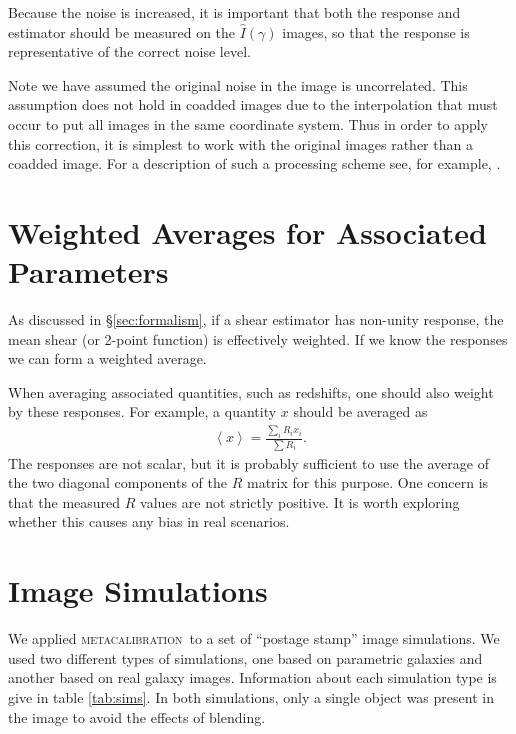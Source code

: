 \documentclass[iop]{emulateapj}
\newcommand{\mcal}{\textsc{metacalibration}}
\begin{document}
Because the noise is increased, it is important that both the response and
estimator should be measured on the $\hat{I}(\gamma)$ images, so that the
response is representative of the correct noise level.

Note we have assumed the original noise in the image is uncorrelated.  This
assumption does not hold in coadded images due to the interpolation that must
occur to put all images in the same coordinate system.  Thus in order to apply
this correction, it is simplest to work with the original images rather than
a coadded image.  For a description of such a processing scheme see, for example,
\cite{DESSVShear}.


\section{Weighted Averages for Associated Parameters} \label{sec:weighting}

As discussed in \S \ref{sec:formalism}, if a shear estimator has
non-unity response, the mean shear (or 2-point function) is effectively
weighted.  If we know the responses we can form a weighted average.

When averaging associated quantities, such as redshifts, one should also weight
by these responses.  For example, a quantity $x$ should be averaged as
\begin{align}
    \left< x \right> = \frac{\sum_i R_i x_i}{\sum R_i}.
\end{align}
The responses are not scalar, but it is probably sufficient
to use the average of the two diagonal components of the $R$ matrix
for this purpose. One concern is that the measured $R$ values are not
strictly positive.  It is worth exploring whether this causes
any bias in real scenarios.

\section{Image Simulations} \label{sec:sims}

We applied \mcal\ to a set of ``postage stamp'' image simulations.  We used two
different types of simulations, one based on parametric galaxies and another
based on real galaxy images.  Information about each simulation type is give in
table \ref{tab:sims}.  In both simulations, only a single object was present
in the image to avoid the effects of blending.
\end{document}
